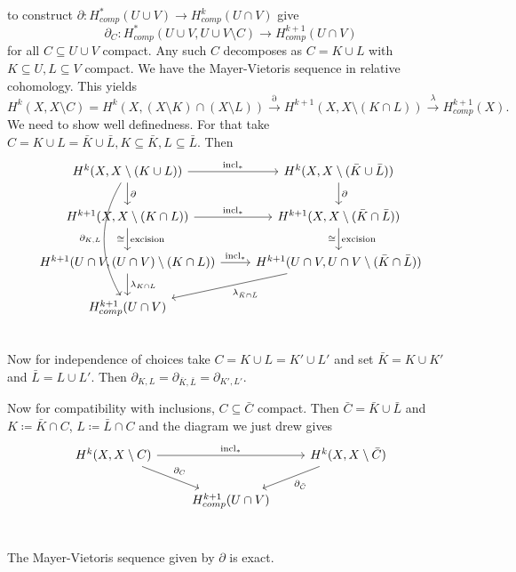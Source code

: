 \documentclass[language=english]{TemplateLecture}
\begin{document}
\begin{construction}
    to construct \(\partial\colon H_{comp}^*(U \cup V) \to H_{comp}^k(U \cap V)\) give 
    \[\partial_C \colon H_{comp}^*(U \cup V , U \cup V \setminus C) \to H_{comp}^{k+1}(U \cap V)\]
    for all \(C \subseteq U \cup V\) compact. Any such \(C\) decomposes as \(C = K \cup L\) with \(K \subseteq U, L \subseteq V\) compact. We have the Mayer-Vietoris sequence in relative cohomology. This yields
    \[H^k(X, X\setminus C) = H^k(X, (X\setminus K) \cap (X \setminus L)) \xrightarrow{\partial} H^{k+1}(X, X\setminus(K \cap L)) \xrightarrow{\lambda} H_{comp}^{k+1}(X).\]
    We need to show well definedness. For that take \(C = K \cup  L = \bar K \cup \bar L, K \subseteq \bar K, L \subseteq \bar L\). Then
    \[\begin{tikzcd}
        {H^k(X, X\setminus (K \cup L))} \ar[ddd, bend right, "\partial_{K,L}"'] \ar[r, "\incl_*"] \ar[d, "\partial"] & {H^k(X, X\setminus(\bar K \cup \bar L))} \ar[d, "\partial"] \\
        {H^{k+1}(X, X\setminus (K \cap L))} \ar[r, "\incl_*"] \ar[d, "\text{excision}", "\cong"'] & {H^{k+1}(X, X\setminus (\bar K\cap \bar L))} \ar[d, "\text{excision}", "\cong"'] \\
        {H^{k+1}(U \cap V, (U \cap V) \setminus (K \cap L))} \ar[r, "\incl_*"] \ar[d, "\lambda_{K \cap L}"] & {H^{k+1}(U \cap V, U \cap V\setminus(\bar K \cap \bar L))} \ar[dl, "\lambda_{\bar K \cap \bar L}"] \\
        H_{comp}^{k+1}(U \cap V) & \\
    \end{tikzcd}\]
    Now for independence of choices take \(C = K \cup L = K' \cup L'\) and set \(\bar K = K \cup K'\) and \(\bar L = L \cup L'\). Then \(\partial_{K,L} = \partial_{\bar K, \bar L} = \partial_{K', L'}\).

    Now for compatibility with inclusions, \(C \subseteq \bar C\) compact. Then \(\bar C = \bar K \cup \bar L\) and \(K \coloneq \bar K \cap C\), \(L \coloneq \bar L \cap C\) and the diagram we just drew gives
    \[\begin{tikzcd}
        H^k(X, X\setminus C) \ar[rr, "\incl_*"] \ar[rd, "\partial_C"] && H^k(X, X\setminus \bar C) \ar[dl, "\partial_{\bar C}"] \\
        & H_{comp}^{k+1}(U \cap V) &\\
    \end{tikzcd}\]

    \begin{proposition}
        The Mayer-Vietoris sequence given by \(\partial\) is exact.
    \end{proposition}


\end{construction}
\end{document}
